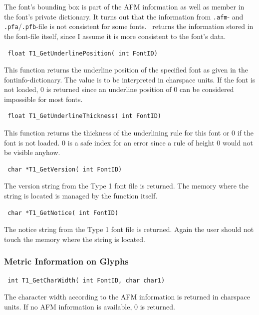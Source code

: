 The font's bounding box is part of the AFM information as well as member in
the font's private dictionary. It turns out that the information from
\verb+.afm+- and \verb+.pfa+/\verb+.pfb+-file is not consistent for some
fonts. \tonelib\ returns the information stored in the font-file itself, since
I assume it is more consistent to the font's data.

\precorr
\begin{verbatim}
 float T1_GetUnderlinePosition( int FontID)
\end{verbatim}\postcorr
This function returns the underline position of the specified font as given in
the fontinfo-dictionary. The value is to be interpreted in charspace
units. If the font is not loaded, 0 is returned since an
underline position of 0 can be considered impossible for most fonts.

\precorr
\begin{verbatim}
 float T1_GetUnderlineThickness( int FontID)
\end{verbatim}\postcorr
This function returns the thickness of the underlining rule for this font or 0
if the font is not loaded. 0 is a safe index for an error since a rule of
height 0 would not be visible anyhow. 

\precorr
\begin{verbatim}
 char *T1_GetVersion( int FontID)
\end{verbatim}\postcorr
The version string from the Type 1 font file is returned. The memory
where the string is located is managed by the function itself.

\precorr
\begin{verbatim}
 char *T1_GetNotice( int FontID)
\end{verbatim}\postcorr
The notice string from the Type 1 font file is returned. Again the
user should not touch the memory where the string is located.

\subsubsection{Metric Information on Glyphs}
\label{metricinformation}%
\precorr
\begin{verbatim}
 int T1_GetCharWidth( int FontID, char char1)
\end{verbatim}\postcorr
The character width according to the AFM information is returned in charspace
units. If no AFM information is available, 0 is returned. 

